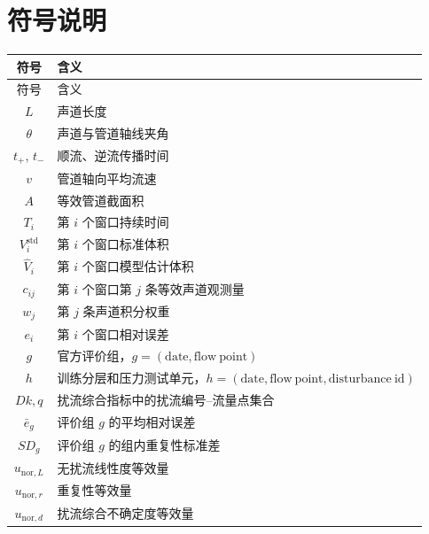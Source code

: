 \section{符号说明}

\begin{longtable}{cl}
\toprule
符号 & 含义 \\
\midrule
\endfirsthead
\toprule
符号 & 含义 \\
\midrule
\endhead
$L$ & 声道长度 \\
$\theta$ & 声道与管道轴线夹角 \\
$t_+$, $t_-$ & 顺流、逆流传播时间 \\
$v$ & 管道轴向平均流速 \\
$A$ & 等效管道截面积 \\
$T_i$ & 第 $i$ 个窗口持续时间 \\
$V_i^{\mathrm{std}}$ & 第 $i$ 个窗口标准体积 \\
$\hat V_i$ & 第 $i$ 个窗口模型估计体积 \\
$c_{ij}$ & 第 $i$ 个窗口第 $j$ 条等效声道观测量 \\
$w_j$ & 第 $j$ 条声道积分权重 \\
$e_i$ & 第 $i$ 个窗口相对误差 \\
$g$ & 官方评价组，$g=(\mathrm{date},\mathrm{flow\ point})$ \\
$h$ & 训练分层和压力测试单元，$h=(\mathrm{date},\mathrm{flow\ point},\mathrm{disturbance\ id})$ \\
$Dk,q$ & 扰流综合指标中的扰流编号--流量点集合 \\
$\bar e_g$ & 评价组 $g$ 的平均相对误差 \\
$SD_g$ & 评价组 $g$ 的组内重复性标准差 \\
$u_{\mathrm{nor},L}$ & 无扰流线性度等效量 \\
$u_{\mathrm{nor},r}$ & 重复性等效量 \\
$u_{\mathrm{nor},d}$ & 扰流综合不确定度等效量 \\
\bottomrule
\end{longtable}
